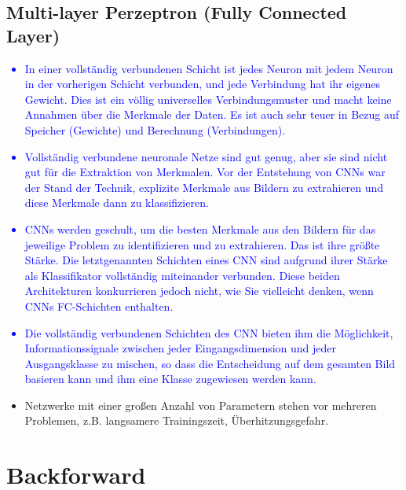 \documentclass[12pt,a4paper]{scrartcl}
\numberwithin{equation}{section}
\begin{document}
\subsection{Multi-layer Perzeptron (Fully Connected Layer)}\label{FC}
\textcolor{blue}{
	\begin{itemize}
		\item In einer vollständig verbundenen Schicht ist jedes Neuron mit jedem Neuron in der vorherigen Schicht verbunden, und jede Verbindung hat ihr eigenes Gewicht. Dies ist ein völlig universelles Verbindungsmuster und macht keine Annahmen über die Merkmale der Daten. Es ist auch sehr teuer in Bezug auf Speicher (Gewichte) und Berechnung (Verbindungen).
		\item Vollständig verbundene neuronale Netze sind gut genug, aber sie sind nicht gut für die Extraktion von Merkmalen. Vor der Entstehung von CNNs war der Stand der Technik, explizite Merkmale aus Bildern zu extrahieren und diese Merkmale dann zu klassifizieren.
		\item CNNs werden geschult, um die besten Merkmale aus den Bildern für das jeweilige Problem zu identifizieren und zu extrahieren. Das ist ihre größte Stärke. Die letztgenannten Schichten eines CNN sind aufgrund ihrer Stärke als Klassifikator vollständig miteinander verbunden. Diese beiden Architekturen konkurrieren jedoch nicht, wie Sie vielleicht denken, wenn CNNs FC-Schichten enthalten.
		\item Die vollständig verbundenen Schichten des CNN bieten ihm die Möglichkeit, Informationssignale zwischen jeder Eingangsdimension und jeder Ausgangsklasse zu mischen, so dass die Entscheidung auf dem gesamten Bild basieren kann und ihm eine Klasse zugewiesen werden kann.
	\end{itemize}}
\begin{itemize}
	\item Netzwerke mit einer großen Anzahl von Parametern stehen vor mehreren Problemen, z.B. langsamere Trainingszeit, Überhitzungsgefahr.
\end{itemize}
\section{Backforward }
\end{document}
